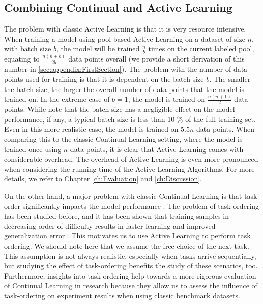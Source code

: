 \subsection{Combining Continual and Active Learning}
\label{sec:Methodology:CombiningCLandAL}
The problem with classic Active Learning is that it is very resource intensive. When training a model using pool-based Active Learning on a dataset of size $n$,
with batch size $b$, the model will be trained $\frac{n}{b}$ times on the current labeled pool, equating to $\frac{n(n+b)}{2b}$ data points overall (we provide a
short derivation of this number in \ref{sec:appendix:FirstSection}). The problem with the number of data points used for training is that it is dependent on the
batch size $b$. The smaller the batch size, the larger the overall number of data points that the model is trained on. In the extreme case of $b=1$, the model
is trained on $\frac{n(n+1)}{2}$ data points. While \cite{beck2021effective} note that the batch size has a negligible effect on the model performance,
if any, a typical batch size is less than 10 \% of the full training set. Even in this more realistic case, the model is trained on $5.5n$ data points. When
comparing this to the classic Continual Learning setting, where the model is trained once using $n$ data points, it is clear that Active Learning comes
with considerable overhead. The overhead of Active Learning is even more pronounced when considering the running time of the Active Learning Algorithms.
For more details, we refer to Chapter \ref{ch:Evaluation} and \ref{ch:Discussion}. \par
On the other hand, a major problem with classic Continual Learning is that task order significantly impacts the model performance \cite{bell2022effect}.
The problem of task ordering has been studied before, and it has been shown that training samples in decreasing order of difficulty results in faster learning and 
improved generalization error \cite{hacohen2019power}. This motivates us to use Active Learning to perform task ordering. We should note here that we
assume the free choice of the next task. This assumption is not always realistic, especially when tasks arrive sequentially, but studying the effect of task-ordering
benefits the study of these scenarios, too. Furthermore, insights into task-ordering help towards a more rigorous evaluation of Continual Learning in 
research because they allow us to assess the influence of task-ordering on experiment results when using classic benchmark datasets. \par
